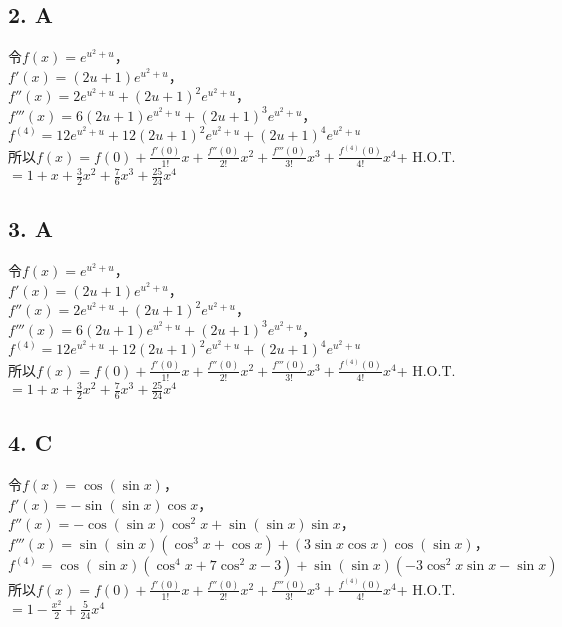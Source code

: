 \documentclass[a5paper, 11pt]{article}
\begin{document}
\subsection*{2. A}
令$f(x) = e^{u^2+u}$，\\
$f'(x) = (2u+1)e^{u^2+u}$，\\
$f''(x) = 2e^{u^2+u} + (2u+1)^2e^{u^2+u}$，\\
$f'''(x) = 6(2u+1)e^{u^2+u} + (2u+1)^3e^{u^2+u}$，\\
$f^{(4)} = 12e^{u^2+u} + 12(2u+1)^2e^{u^2+u} + (2u+1)^4e^{u^2+u}$\\
所以$f(x) = f(0) + \frac{f'(0)}{1!} x+ \frac{f''(0)}{2!} x^2+ \frac{f'''(0)}{3!} x^3 + \frac{f^{(4)}(0)}{4!} x^4 $+ H.O.T.\\
\hspace*{43pt} $= 1 + x + \frac{3}{2}x^2 + \frac{7}{6}x^3 + \frac{25}{24}x^4$

\subsection*{3. A}
令$f(x) = e^{u^2+u}$，\\
$f'(x) = (2u+1)e^{u^2+u}$，\\
$f''(x) = 2e^{u^2+u} + (2u+1)^2e^{u^2+u}$，\\
$f'''(x) = 6(2u+1)e^{u^2+u} + (2u+1)^3e^{u^2+u}$，\\
$f^{(4)} = 12e^{u^2+u} + 12(2u+1)^2e^{u^2+u} + (2u+1)^4e^{u^2+u}$\\
所以$f(x) = f(0) + \frac{f'(0)}{1!} x+ \frac{f''(0)}{2!} x^2+ \frac{f'''(0)}{3!} x^3 + \frac{f^{(4)}(0)}{4!} x^4 $+ H.O.T.\\
\hspace*{43pt} $= 1 + x + \frac{3}{2}x^2 + \frac{7}{6}x^3 + \frac{25}{24}x^4$

\subsection*{4. C}
令$f(x) = \cos(\sin x)$，\\
$f'(x) = -\sin(\sin x) \cos x$，\\
$f''(x) = -\cos (\sin x)\cos^2 x + \sin(\sin x)\sin x$，\\
$f'''(x) = \sin(\sin x)(\cos^3 x + \cos x) + (3 \sin x \cos x) \cos(\sin x)$，\\
$f^{(4)} = \cos(\sin x)(\cos^4x + 7\cos^2x - 3) + \sin(\sin x)(-3\cos^2x\sin x - \sin x)$\\
所以$f(x) = f(0) + \frac{f'(0)}{1!} x+ \frac{f''(0)}{2!} x^2+ \frac{f'''(0)}{3!} x^3 + \frac{f^{(4)}(0)}{4!} x^4 $+ H.O.T.\\
\hspace*{43pt} $= 1 - \frac{x^2}{2} + \frac{5}{24}x^4$
\end{document}
